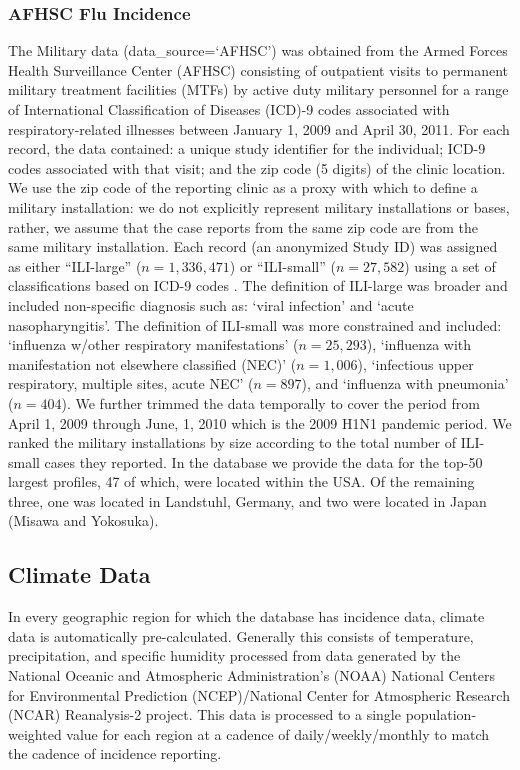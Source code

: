 \documentclass[a4paper]{article}
\begin{document}
\subsubsection{AFHSC Flu Incidence}
The Military data (data\_source=`AFHSC') was obtained from the Armed Forces Health Surveillance Center (AFHSC) consisting of outpatient visits to permanent military treatment facilities (MTFs) by active duty military personnel for a range of International Classification of Diseases (ICD)-9 codes associated with respiratory-related illnesses between January 1, 2009 and April 30, 2011.  For each record, the data contained: a unique study identifier for the individual; ICD-9 codes associated with that visit; and the zip code (5 digits) of the clinic location.  We use the zip code of the reporting clinic as a proxy with which to define a military installation: we do not explicitly represent military installations or bases, rather, we assume that the case reports from the same zip code are from the same military installation.  Each record (an anonymized Study ID) was assigned as either ``ILI-large'' ($n=1,336,471$)  or ``ILI-small'' ($n=27,582$) using a set of classifications based on ICD-9 codes \cite{riley13a}. The definition of ILI-large was broader and included non-specific diagnosis such as: `viral infection' and `acute nasopharyngitis'. The definition of ILI-small was more constrained and included: `influenza w/other respiratory manifestations' ($n=25,293$), `influenza with manifestation not elsewhere classified (NEC)' ($n=1,006$), `infectious upper respiratory, multiple sites, acute NEC' ($n=897$), and `influenza with pneumonia' ($n=404$).  We further trimmed the data temporally to cover the period from April 1, 2009 through June, 1, 2010 which is the 2009 H1N1 pandemic period.  We ranked the military installations by size according to the total number of ILI-small cases they reported. In the  database we provide the data for the top-50 largest profiles, 47 of which, were located within the USA.  Of the remaining three, one was located in Landstuhl, Germany, and two were located in Japan (Misawa and Yokosuka).



\subsection{Climate Data}
In every geographic region for which the  database has incidence data, climate data is automatically pre-calculated.  Generally this consists of temperature, precipitation, and specific humidity processed from data generated by the National Oceanic and Atmospheric Administration's (NOAA) National Centers for Environmental Prediction (NCEP)/National Center for Atmospheric Research (NCAR) Reanalysis-2 project. This data is processed to a single population-weighted value for each region at a cadence of daily/weekly/monthly to match the cadence of incidence reporting.
\end{document}
